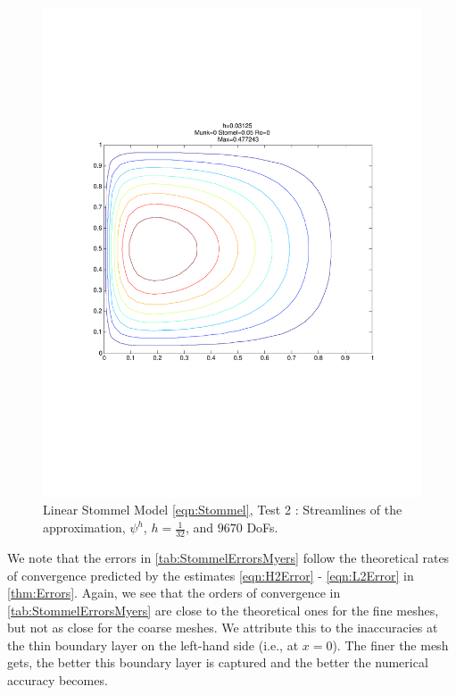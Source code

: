 \begin{figure}[H]
  \begin{center}
    \includegraphics[trim=0 200 20 220, clip=true, scale=0.5]{LinearStommelMyers.pdf}
    \caption{Linear Stommel Model \eqref{eqn:Stommel}, Test 2 \cite{Myers}: Streamlines of the approximation,
    $\psi^h$, $h=\frac{1}{32}$, and $9670$ DoFs.}
    \label{fig:StommelMyers}
  \end{center}
\end{figure}

We note that the errors in \autoref{tab:StommelErrorsMyers} follow the theoretical rates of convergence predicted by the
estimates \eqref{eqn:H2Error} - \eqref{eqn:L2Error} in \autoref{thm:Errors}. Again, we see that the orders of
convergence in \autoref{tab:StommelErrorsMyers} are close to the theoretical ones for the fine meshes, but not as close
for the coarse meshes. We attribute this to the inaccuracies at the thin boundary layer on the left-hand side (i.e., at
$x=0$). The finer the mesh gets, the better this boundary layer is captured and the better the numerical accuracy becomes.

